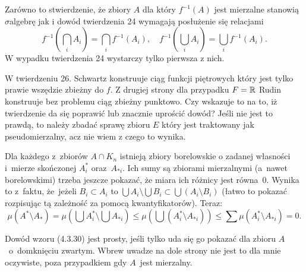 \documentclass[a4paper,11pt]{article}
\begin{document}
\vspace{\spaceFour}


\start {} Zarówno to stwierdzenie, że zbiory $A$ dla który
$f^{ -1 }( A )$ jest mierzalne stanowią $\sigma$\dywiz algebrę jak i
dowód twierdzenia 24 wymagają posłużenie się relacjami
\begin{equation*}
  f^{ -1 }( \bigcap_{ i } A_{ i } ) = \bigcap_{ i } f^{ -1 }( A_{ i } ),
  \quad f^{ -1 }( \bigcup_{ i } A_{ i } ) = \bigcup_{ i }
  f^{ -1 }( A_{ i } ).
\end{equation*}
W wypadku twierdzenia 24 wystarczy tylko pierwsza z nich.

\vspace{\spaceFour}


\start {} W twierdzeniu 26. Schwartz konstruuje ciąg funkcji
piętrowych który jest tylko prawie wszędzie zbieżny do $f$. Z drugiej
strony dla przypadku $F = \mathbb{R}$ Rudin \cite{Rud86} konstruuje bez
problemu ciąg zbieżny punktowo. Czy wskazuje to na to, iż twierdzenie
da się poprawić lub znacznie uprościć dowód? Jeśli nie jest to prawdą,
to należy zbadać sprawę zbioru $E$ który jest traktowany jak
pseudomierzalny, acz nie wiem z czego to wynika.

\vspace{\spaceFour}


\start {} Dla każdego z~zbiorów $A \cap K_{ n }$ istnieją
zbiory borelowskie o zadanej własności i~mierze skończonej
$A_{ i }^{ * }$ oraz~$A_{ * i }$. Ich sumy są zbiorami mierzalnymi
(a~nawet borelowskimi) trzeba jeszcze pokazać, że miara ich różnicy
jest równa~0. Wynika to z~faktu, że~jeżeli $B_{ i } \subset A_{ i }$
to
$\bigcup A_{ i } \setminus \bigcup B_{ i } \subset \bigcup ( A_{ i }
\setminus B_{ i } )$ (łatwo to pokazać rozpisując tą zależność za
pomocą kwantyfikatorów). Teraz:
\begin{equation*}
  \mu( A^{ * } \setminus A_{ * } ) = \mu\left( \bigcup A^{ * }_{ i }
    \setminus \bigcup A_{ * i } \right) \leq \mu\left( \bigcup
    ( A^{ * }_{ i } \setminus A_{ * i } ) \right) \leq
  \sum \mu( A^{ * }_{ i } \setminus A_{ * i } ) = 0.
\end{equation*}

\vspace{\spaceFour}


\start {} Dowód wzoru (4.3.30) jest prosty, jeśli tylko uda się
go pokazać dla zbioru $A$~o~domknięciu zwartym. Wbrew uwadze na dole
strony nie jest to dla mnie oczywiste, poza przypadkiem gdy $A$~jest
mierzalny.
\end{document}
